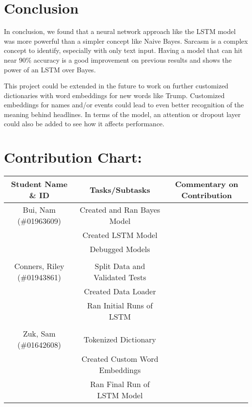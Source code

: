 \documentclass[11pt]{article}
\begin{document}



\section{Conclusion}

In conclusion, we found that a neural network approach like the LSTM model was more powerful than a simpler concept like Naive Bayes. Sarcasm is a complex concept to identify, especially with only text input. Having a model that can hit near 90\% accuracy is a good improvement on previous results and shows the power of an LSTM over Bayes. 

This project could be extended in the future to work on further customized dictionaries with word embeddings for new words like Trump. Customized embeddings for names and/or events could lead to even better recognition of the meaning behind headlines. In terms of the model, an attention or dropout layer could also be added to see how it affects performance. 

\section{Contribution Chart:}

\begin{table}[H]
    \centering
    \begin{tabular}{c|c|c}
        Student Name \& ID  & Tasks/Subtasks &  Commentary on Contribution \\
        \hline
        Bui, Nam (\#01963609) & Created and Ran Bayes Model& \\
        & Created LSTM Model & \\
        & Debugged Models & \\
        &&\\
        \hline
        Conners, Riley (\#01943861) & Split Data and Validated Tests& \\
        & Created Data Loader & \\
        & Ran Initial Runs of LSTM & \\
        &&\\
        \hline
        Zuk, Sam (\#01642608)& Tokenized Dictionary & \\
        & Created Custom Word Embeddings & \\
        & Ran Final Run of LSTM Model& \\
    \end{tabular}
    \label{tab:my_label}
\end{table}



\end{document}
